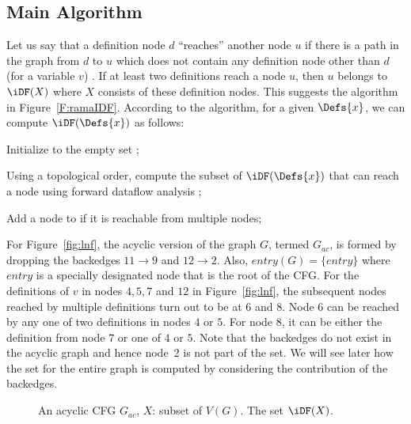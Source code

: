 {    \subsection{Main Algorithm}
    
Let us say that a definition node $d$ ``reaches'' another node $u$ if there is a path in the graph from $d$ to $u$ which does not contain any definition node other than $d$ (for a variable $v$) . If at least two definitions reach a node $u$, then $u$ belongs to $\iDF(X)$ where $X$ consists of these definition nodes. This suggests the algorithm in Figure~\ref{F:ramaIDF}. According to the algorithm, for a given $\Defs{x}$, we can compute $\iDF(\Defs{x})$ as follows:
\begin{itemize}
\item { Initialize \iDF to the empty set };
\item { Using a topological order, compute the subset of $\iDF(\Defs{x})$ that can reach a node using forward dataflow analysis };
{\item} {Add a node to \iDF if it is reachable from multiple nodes};
\end{itemize}  

    For Figure~\ref{fig:lnf}, the acyclic version of the graph $G$, termed $G_{ac}$, is formed by dropping the backedges $11 \rightarrow 9$ and $12 \rightarrow 2$. Also, $entry(G) = \{entry\}$ where $entry$ is a specially designated node that is the root of the CFG. For the definitions of $v$ in nodes $4,5,7$ and $12$ in Figure~\ref{fig:lnf}, the subsequent nodes reached by multiple definitions turn out to be at $6$ and $8$. Node $6$ can be reached by any one of two definitions in nodes $4$ or $5$. For node $8$, it can be either the definition from node $7$ or one of $4$ or $5$. Note that the backedges do not exist in the acyclic graph and hence node~2 is not part of the \iDF set. We will see later how the \iDF set for the entire graph is computed by considering the contribution of the backedges. 



    
   \begin{figure}[!ht]
   \centering
  \begin{minipage}[t]{5in}
   An acyclic CFG $G_{ac}$, $X$: subset of $V(G)$.
   The set $\iDF(X)$.
  \setcounter{linectr}{0}


\end{minipage}
\end{figure}}
